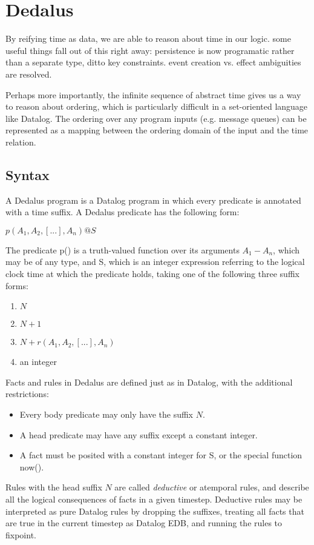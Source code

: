 \section{Dedalus}

By reifying time as data, we are able to reason about time in our logic.  some useful things fall out of this right away: persistence is now programatic rather than a separate type, ditto key constraints.  event creation vs. effect ambiguities are resolved.

Perhaps more importantly, the infinite sequence of abstract time gives us a way to reason about ordering, which is particularly difficult in a set-oriented language like Datalog.  The ordering over any program inputs (e.g. message queues) can be represented as a mapping between the ordering domain of the input and the time relation.

\subsection{Syntax}

A Dedalus program is a Datalog program in which every predicate is annotated with a time suffix.  A Dedalus predicate has the following form:

$p(A_{1}, A_{2}, [...], A_{n})@S$

The predicate p() is a truth-valued function over its arguments $A_{1} - A_{n}$, which may be of any type, and S, which is an integer expression 
referring to the logical clock time at which the predicate holds, taking one of the following three suffix forms:

\begin{enumerate}
\item $N$
\item $N + 1$
\item $N + r(A_{1}, A_{2}, [...], A_{n})$
\item an integer
\end{enumerate}

Facts and rules in Dedalus are 
defined just as in Datalog, with the additional restrictions:

\begin{itemize}
\item Every body predicate may only have the suffix $N$.
\item A head predicate may have any suffix except a constant integer.
\item A fact must be posited with a constant integer for S, or the special function now().
\end{itemize}
Rules with the head suffix $N$ are called \emph{deductive} or atemporal rules, and describe all the logical consequences of facts in a given 
timestep. Deductive rules may be interpreted as pure Datalog rules by dropping the suffixes, treating all facts that are true in the current 
timestep as Datalog EDB, and running the rules to fixpoint.

